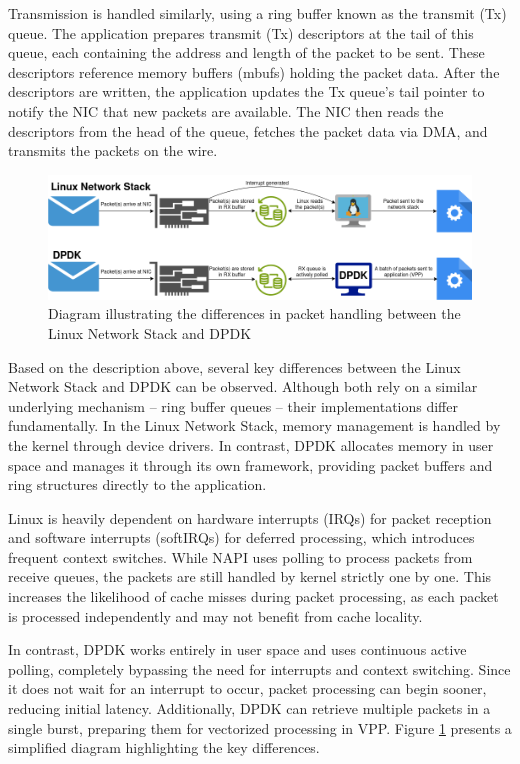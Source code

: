 Transmission is handled similarly, using a ring buffer known as the transmit (Tx) queue.
The application prepares transmit (Tx) descriptors at the tail of this queue, each containing the address and length of the packet to be sent.
These descriptors reference memory buffers (mbufs) holding the packet data. 
After the descriptors are written, the application updates the Tx queue’s tail pointer to notify the NIC that new packets are available.
The NIC then reads the descriptors from the head of the queue, fetches the packet data via DMA, and transmits the packets on the wire.~\cite{intel-pcie-traffic-2025}

\begin{figure}[!htbp]
    \centering
    \includegraphics[width=0.99\linewidth]{images/dpdk-vs-linux.png}
    \caption{Diagram illustrating the differences in packet handling between the Linux Network Stack and DPDK}
    \label{fig:dpdk}
\end{figure}

Based on the description above, several key differences between the Linux Network Stack and DPDK can be observed.
Although both rely on a similar underlying mechanism -- ring buffer queues -- their implementations differ fundamentally.
In the Linux Network Stack, memory management is handled by the kernel through device drivers. 
In contrast, DPDK allocates memory in user space and manages it through its own framework, providing packet buffers and ring structures directly to the application.

Linux is heavily dependent on hardware interrupts (IRQs) for packet reception and software interrupts (softIRQs) for deferred processing, which introduces frequent context switches. 
While NAPI uses polling to process packets from receive queues, the packets are still handled by kernel strictly one by one.
This increases the likelihood of cache misses during packet processing, as each packet is processed independently and may not benefit from cache locality.

In contrast, DPDK works entirely in user space and uses continuous active polling, completely bypassing the need for interrupts and context switching. 
Since it does not wait for an interrupt to occur, packet processing can begin sooner, reducing initial latency. 
Additionally, DPDK can retrieve multiple packets in a single burst, preparing them for vectorized processing in VPP.
Figure \ref{fig:dpdk} presents a simplified diagram highlighting the key differences.


